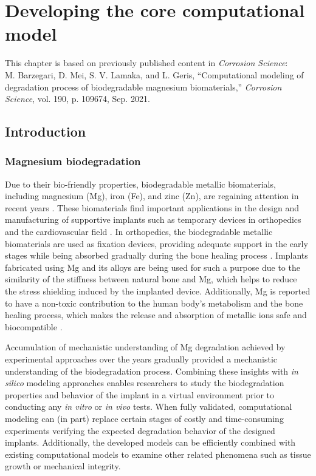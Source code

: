 \chapter{Developing the core computational model}\label{ch:core}

\begin{shaded}
This chapter is based on previously published content in \textit{Corrosion Science}:\\
M. Barzegari, D. Mei, S. V. Lamaka, and L. Geris, ``Computational modeling of degradation process of biodegradable magnesium biomaterials,'' \textit{Corrosion Science}, vol. 190, p. 109674, Sep. 2021.
\end{shaded}

\section{Introduction}

\subsection{Magnesium biodegradation}

Due to their bio-friendly properties, biodegradable metallic biomaterials, including magnesium (Mg), iron (Fe), and zinc (Zn), are regaining attention in recent years \cite{Zheng2014}. These biomaterials find important applications in the design and manufacturing of supportive implants such as temporary devices in orthopedics and the cardiovascular field  \cite{Chen2014,Zhao2017}. In orthopedics, the biodegradable metallic biomaterials are used as fixation devices, providing adequate support in the early stages while being absorbed gradually during the bone healing process \cite{Qin2019}. Implants fabricated using Mg and its alloys are being used for such a purpose \cite{Riaz2018} due to the similarity of the stiffness between natural bone and Mg, which helps to reduce the stress shielding induced by the implanted device. Additionally, Mg is reported to have a non-toxic contribution to the human body's metabolism and the bone healing process, which makes the release and absorption of metallic ions safe and biocompatible \cite{Xin2008}.

Accumulation of mechanistic understanding of Mg degradation achieved by experimental approaches over the years gradually provided a mechanistic understanding of the biodegradation process. Combining these insights with \textit{in silico} modeling approaches enables researchers to study the biodegradation properties and behavior of the implant in a virtual environment prior to conducting any \textit{in vitro} or \textit{in vivo} tests. When fully validated, computational modeling can (in part) replace certain stages of costly and time-consuming experiments verifying the expected degradation behavior of the designed implants. Additionally, the developed models can be efficiently combined with existing computational models to examine  other related phenomena such as tissue growth or mechanical integrity.

